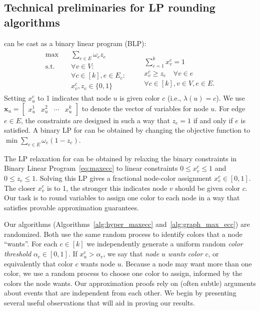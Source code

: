\subsection{Technical preliminaries for LP rounding algorithms}
\maxecc{} can be cast as a binary linear program (BLP):
\begin{align}
	\label{eq:maxecc}
	\begin{aligned}
		\text{max} \quad  & \textstyle \sum_{e \in E} \omega_e z_e \\
		\text{s.t.} \quad & \forall v \in V:                       \\
		                  & \forall c \in [k], e \in E_c:          \\
		                  & x_v^c, z_e \in \{0, 1\}
	\end{aligned}
	\begin{aligned}
		      &                                      \\
		      & \textstyle \sum_{c=1}^k x_v^c = 1    \\
		\quad & x_v^c \geq z_e \quad \forall v \in e \\
		      & \forall c \in [k], v \in V, e \in E.
	\end{aligned}
\end{align}
Setting $x_{u}^c$ to 1 indicates that node $u$ is given color $c$ (i.e., $\lambda(u) = c$). We use $\textbf{x}_u = \begin{bmatrix} x_u^1 & x_u^2 & \cdots & x_u^k \end{bmatrix}$ to denote the vector of variables for node $u$. For edge $e \in E$, the constraints are designed in such a way that $z_e = 1$ if and only if $e$ is satisfied. A binary LP for \minecc{} can be obtained by changing the objective function to $\min \sum_{e \in E} \omega_e (1-z_e)$.

The LP relaxation for \maxecc{} can be obtained by relaxing the binary constraints in Binary Linear  Program~\eqref{eq:maxecc} to linear constraints $0 \leq x_v^c \leq 1$ and $0 \leq z_e \leq 1$. Solving this LP gives a fractional node-color assignment $x_v^c \in [0,1]$. The closer $x_v^c$ is to 1, the stronger this indicates node $v$ should be given color $c$. Our task is to round variables to assign one color to each node in a way that satisfies provable approximation guarantees.

Our algorithms (Algorithms~\ref{alg:hyper_maxecc} and~\ref{alg:graph_max_ecc}) are randomized. Both use the same random process to identify colors that a node ``wants''. For each $c \in [k]$ we {independently} generate a uniform random \emph{color threshold} $\alpha_c \in [0,1]$. If $x_u^c > \alpha_c$, we say that \emph{node $u$ wants color $c$}, or equivalently that color $c$ wants node $u$. Because a node may want more than one color, we use a random process to choose one color to assign, informed by the colors the node wants. Our approximation proofs rely on (often subtle) arguments about events that are independent from each other. We begin by presenting several useful observations that will aid in proving our results.

